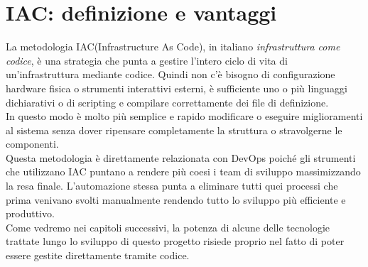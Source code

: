 \documentclass[a4paper,12pt]{report}
\begin{document}
\section{IAC: definizione e vantaggi}
La metodologia IAC(Infrastructure As Code), in italiano \textit{infrastruttura come codice}, è una strategia che punta a gestire l'intero ciclo di vita di un'infrastruttura mediante codice. Quindi non c'è bisogno di configurazione hardware fisica o strumenti interattivi esterni, è sufficiente uno o più linguaggi dichiarativi o di scripting e compilare correttamente dei file di definizione.\cite{iacdef} \\ 
In questo modo è molto più semplice e rapido modificare o eseguire miglioramenti al sistema senza dover ripensare completamente la struttura o stravolgerne le componenti. \\
Questa metodologia è direttamente relazionata con DevOps poiché gli strumenti che utilizzano IAC puntano a rendere più coesi i team di sviluppo massimizzando la resa finale. L'automazione stessa punta a eliminare tutti quei processi che prima venivano svolti manualmente rendendo tutto lo sviluppo più efficiente e produttivo.\cite{iaceng}\\
Come vedremo nei capitoli successivi, la potenza di alcune delle tecnologie trattate lungo lo sviluppo di questo progetto risiede proprio nel fatto di poter essere gestite direttamente tramite codice.\\ \\ \\ \\ \\ \\
\end{document}

